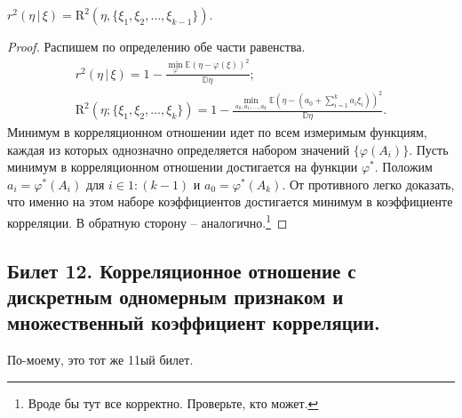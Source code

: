 \begin{thm}
    $r^2(\eta \, | \, \xi) = \mathrm R^2 (\eta, \{\xi_1, \xi_2, \ldots, \xi_{k-1}\})$.
\end{thm}
\begin{proof}
    Распишем по определению обе части равенства.
    \begin{gather*}
        r^2(\eta \, | \, \xi) = 1 - \frac{\min_{\varphi} \mathbb E(\eta - \varphi(\xi))^2}{\mathbb D \eta};\\
        \mathrm R^2(\eta; \{\xi_1, \xi_2, \ldots, \xi_k\}) = 1 - \frac{\min_{a_0, a_1, \ldots, a_k} {\mathbb E}(\eta - (a_0 + \sum_{i=1}^k a_i \xi_i))^2}{{\mathbb D} \eta}.
    \end{gather*}
    Минимум в корреляционном отношении идет по всем измеримым функциям, каждая из которых однозначно определяется набором значений $\{\varphi(A_i)\}$.
    Пусть минимум в корреляционном отношении достигается на функции $\varphi^*$. Положим $a_i = \varphi^*(A_i)$ для $i \in 1:(k-1)$ и $a_0 = \varphi^*(A_k)$.
    От противного легко доказать, что именно на этом наборе коэффициентов достигается минимум в коэффициенте корреляции.
    В обратную сторону -- аналогично.\footnote{\color{blue} Вроде бы тут все корректно. Проверьте, кто может.}
\end{proof}

\subsection{Билет 12. Корреляционное отношение с дискретным одномерным признаком и множественный коэффициент корреляции.}

По-моему, это тот же 11ый билет.

